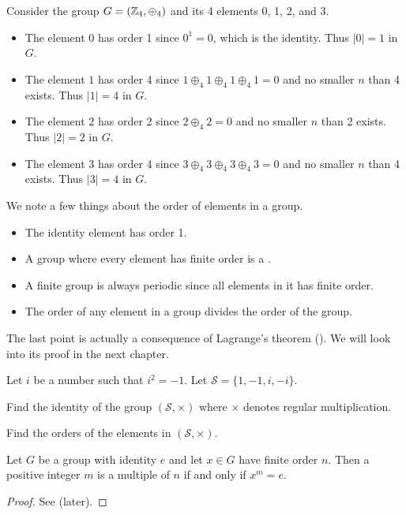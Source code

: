 \begin{example}
    Consider the group $G = (\mathbb{Z}_4, \oplus_4)$ and its 4 elements 0, 1, 2, and 3.
    \begin{itemize}
        \item The element $0$ has order 1 since $0^1 = 0$, which is the identity. Thus $|0| = 1$ in $G$.
        \item The element $1$ has order 4 since $1 \oplus_4 1 \oplus_4 1 \oplus_4 1 = 0$ and no smaller $n$ than 4 exists. Thus $|1| = 4$ in $G$.
        \item The element $2$ has order 2 since $2 \oplus_4 2 = 0$ and no smaller $n$ than 2 exists. Thus $|2| = 2$ in $G$.
        \item The element $3$ has order 4 since $3 \oplus_4 3 \oplus_4 3 \oplus_4 3 = 0$ and no smaller $n$ than 4 exists. Thus $|3| = 4$ in $G$.
    \end{itemize}
\end{example}

We note a few things about the order of elements in a group.
\begin{itemize}
    \item The identity element has order 1.
    \item A group where every element has finite order is a .
    \item A finite group is always periodic since all elements in it has finite order.
    \item The order of any element in a group divides the order of the group.
\end{itemize}
The last point is actually a consequence of Lagrange's theorem (). We will look into its proof in the next chapter.

\begin{exercise}
    Let $i$ be a number such that $i^2 = -1$. Let $\mathcal{S} = \{1, -1, i, -i\}$.
    \begin{partquestions}{\roman*}
        \item Find the identity of the group $(\mathcal{S}, \times)$ where $\times$ denotes regular multiplication.
        \item Find the orders of the elements in $(\mathcal{S}, \times)$.
    \end{partquestions}
\end{exercise}

\begin{lemma}\label{lemma-order-of-an-element-that-is-equivalent-to-identity}
    Let $G$ be a group with identity $e$ and let $x \in G$ have finite order $n$. Then a positive integer $m$ is a multiple of $n$ if and only if $x^m = e$.
\end{lemma}
\begin{proof}
    See  (later).
\end{proof}


